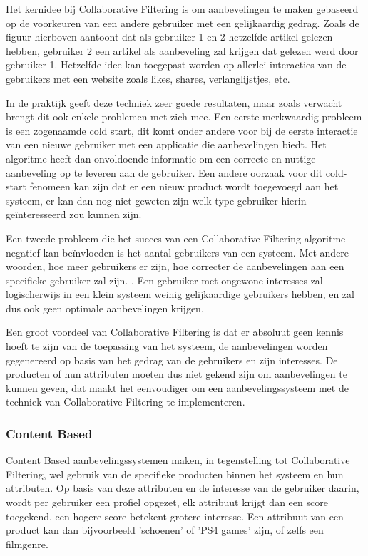 Het kernidee bij Collaborative Filtering \autocite{Schafera} is om aanbevelingen te maken gebaseerd op de voorkeuren van een andere gebruiker met een gelijkaardig gedrag. Zoals de figuur hierboven aantoont dat als gebruiker 1 en 2 hetzelfde artikel gelezen hebben, gebruiker 2 een artikel als aanbeveling zal krijgen dat gelezen werd door gebruiker 1. 
Hetzelfde idee kan toegepast worden op allerlei interacties van de gebruikers met een website zoals likes, shares, verlanglijstjes, etc.

In de praktijk geeft deze techniek zeer goede resultaten, maar zoals verwacht brengt dit ook enkele problemen met zich mee. Een eerste merkwaardig probleem is een zogenaamde cold start, dit komt onder andere voor bij de eerste interactie van een nieuwe gebruiker met een applicatie die aanbevelingen biedt. Het algoritme heeft dan onvoldoende informatie om een correcte en nuttige aanbeveling op te leveren aan de gebruiker. Een andere oorzaak voor dit cold-start fenomeen kan zijn dat er een nieuw product wordt toegevoegd aan het systeem, er kan dan nog niet geweten zijn welk type gebruiker hierin geïnteresseerd zou kunnen zijn. 

\newpage
Een tweede probleem die het succes van een Collaborative Filtering algoritme negatief kan beïnvloeden is het aantal gebruikers van een systeem. Met andere woorden, hoe meer gebruikers er zijn, hoe correcter de aanbevelingen aan een specifieke gebruiker zal zijn. \autocite{Sarwar2001}. Een gebruiker met ongewone interesses zal logischerwijs in een klein systeem weinig gelijkaardige gebruikers hebben, en zal dus ook geen optimale aanbevelingen krijgen.

Een groot voordeel van Collaborative Filtering is dat er absoluut geen kennis hoeft te zijn van de toepassing van het systeem, de aanbevelingen worden gegenereerd op basis van het gedrag van de gebruikers en zijn interesses. De producten of hun attributen moeten dus niet gekend zijn om aanbevelingen te kunnen geven, dat maakt het eenvoudiger om een aanbevelingssysteem met de techniek van Collaborative Filtering te implementeren.

\subsubsection{Content Based}
\label{sec:Content Based}

Content Based aanbevelingssystemen \autocite{Lops2011} maken, in tegenstelling tot Collaborative Filtering, wel gebruik van de specifieke producten binnen het systeem en hun attributen. Op basis van deze attributen en de interesse van de gebruiker daarin, wordt per gebruiker een profiel opgezet, elk attribuut krijgt dan een score toegekend, een hogere score betekent grotere interesse. Een attribuut van een product kan dan bijvoorbeeld 'schoenen' of 'PS4 games' zijn, of zelfs een filmgenre.

